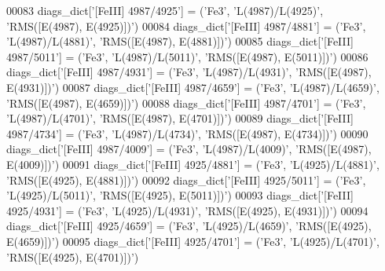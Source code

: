 \begin{DoxyCode}
00083 diags\_dict[\textcolor{stringliteral}{'[FeIII] 4987/4925'}] = (\textcolor{stringliteral}{'Fe3'}, \textcolor{stringliteral}{'L(4987)/L(4925)'}, \textcolor{stringliteral}{'RMS([E(4987), E(4925)])'})
00084 diags\_dict[\textcolor{stringliteral}{'[FeIII] 4987/4881'}] = (\textcolor{stringliteral}{'Fe3'}, \textcolor{stringliteral}{'L(4987)/L(4881)'}, \textcolor{stringliteral}{'RMS([E(4987), E(4881)])'})
00085 diags\_dict[\textcolor{stringliteral}{'[FeIII] 4987/5011'}] = (\textcolor{stringliteral}{'Fe3'}, \textcolor{stringliteral}{'L(4987)/L(5011)'}, \textcolor{stringliteral}{'RMS([E(4987), E(5011)])'})
00086 diags\_dict[\textcolor{stringliteral}{'[FeIII] 4987/4931'}] = (\textcolor{stringliteral}{'Fe3'}, \textcolor{stringliteral}{'L(4987)/L(4931)'}, \textcolor{stringliteral}{'RMS([E(4987), E(4931)])'})
00087 diags\_dict[\textcolor{stringliteral}{'[FeIII] 4987/4659'}] = (\textcolor{stringliteral}{'Fe3'}, \textcolor{stringliteral}{'L(4987)/L(4659)'}, \textcolor{stringliteral}{'RMS([E(4987), E(4659)])'})
00088 diags\_dict[\textcolor{stringliteral}{'[FeIII] 4987/4701'}] = (\textcolor{stringliteral}{'Fe3'}, \textcolor{stringliteral}{'L(4987)/L(4701)'}, \textcolor{stringliteral}{'RMS([E(4987), E(4701)])'})
00089 diags\_dict[\textcolor{stringliteral}{'[FeIII] 4987/4734'}] = (\textcolor{stringliteral}{'Fe3'}, \textcolor{stringliteral}{'L(4987)/L(4734)'}, \textcolor{stringliteral}{'RMS([E(4987), E(4734)])'})
00090 diags\_dict[\textcolor{stringliteral}{'[FeIII] 4987/4009'}] = (\textcolor{stringliteral}{'Fe3'}, \textcolor{stringliteral}{'L(4987)/L(4009)'}, \textcolor{stringliteral}{'RMS([E(4987), E(4009)])'})
00091 diags\_dict[\textcolor{stringliteral}{'[FeIII] 4925/4881'}] = (\textcolor{stringliteral}{'Fe3'}, \textcolor{stringliteral}{'L(4925)/L(4881)'}, \textcolor{stringliteral}{'RMS([E(4925), E(4881)])'})
00092 diags\_dict[\textcolor{stringliteral}{'[FeIII] 4925/5011'}] = (\textcolor{stringliteral}{'Fe3'}, \textcolor{stringliteral}{'L(4925)/L(5011)'}, \textcolor{stringliteral}{'RMS([E(4925), E(5011)])'})
00093 diags\_dict[\textcolor{stringliteral}{'[FeIII] 4925/4931'}] = (\textcolor{stringliteral}{'Fe3'}, \textcolor{stringliteral}{'L(4925)/L(4931)'}, \textcolor{stringliteral}{'RMS([E(4925), E(4931)])'})
00094 diags\_dict[\textcolor{stringliteral}{'[FeIII] 4925/4659'}] = (\textcolor{stringliteral}{'Fe3'}, \textcolor{stringliteral}{'L(4925)/L(4659)'}, \textcolor{stringliteral}{'RMS([E(4925), E(4659)])'})
00095 diags\_dict[\textcolor{stringliteral}{'[FeIII] 4925/4701'}] = (\textcolor{stringliteral}{'Fe3'}, \textcolor{stringliteral}{'L(4925)/L(4701)'}, \textcolor{stringliteral}{'RMS([E(4925), E(4701)])'})

\end{DoxyCode}
